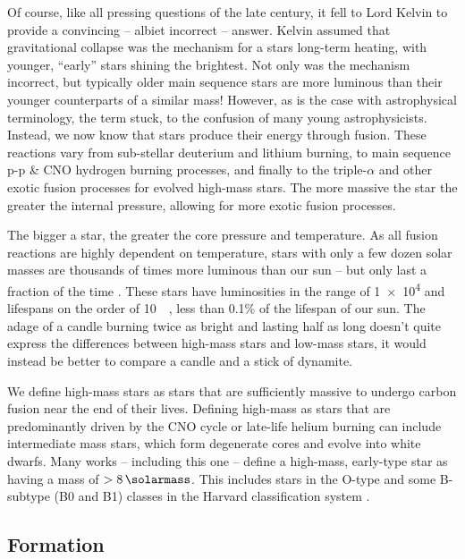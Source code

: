 Of course, like all pressing questions of the late  century, it fell to Lord Kelvin to provide a convincing -- albiet incorrect -- answer.
Kelvin assumed that gravitational collapse was the mechanism for a stars long-term heating, with younger, ``early'' stars shining the brightest.
Not only was the mechanism incorrect, but typically older main sequence stars are more luminous than their younger counterparts of a similar mass!
However, as is the case with astrophysical terminology, the term stuck, to the confusion of many young astrophysicists.
Instead, we now know that stars produce their energy through fusion.
These reactions vary from sub-stellar deuterium and lithium burning, to main sequence p-p \& CNO hydrogen burning processes, and finally to the triple-$\alpha$ and other exotic fusion processes for evolved high-mass stars.
The more massive the star the greater the internal pressure, allowing for more exotic fusion processes.

The bigger a star, the greater the core pressure and temperature.
As all fusion reactions are highly dependent on temperature, stars with only a few dozen solar masses are thousands of times more luminous than our sun -- but only last a fraction of the time \parencite{carrollIntroductionModernAstrophysics2014}.
These stars have luminosities in the range of \SI{1e4}{\solarluminosity} and lifespans on the order of \SI{10}{\mega\year}, less than 0.1\% of the lifespan of our sun.
The adage of a candle burning twice as bright and lasting half as long doesn't quite express the differences between high-mass stars and low-mass stars, it would instead be better to compare a candle and a stick of dynamite.

We define high-mass stars as stars that are sufficiently massive to undergo carbon fusion near the end of their lives.
Defining high-mass as stars that are predominantly driven by the CNO cycle or late-life helium burning can include intermediate mass stars, which form degenerate cores and evolve into white dwarfs.
Many works -- including this one -- define a high-mass, early-type star as having a mass of $>\SI{8}{\solarmass}$.
This includes stars in the O-type and some B-subtype (B0 and B1) classes in the Harvard classification system
\parencite[143]{ward-thompsonIntroductionStarFormation2011}.


\subsection{Formation}
\label{sec:starformation}

